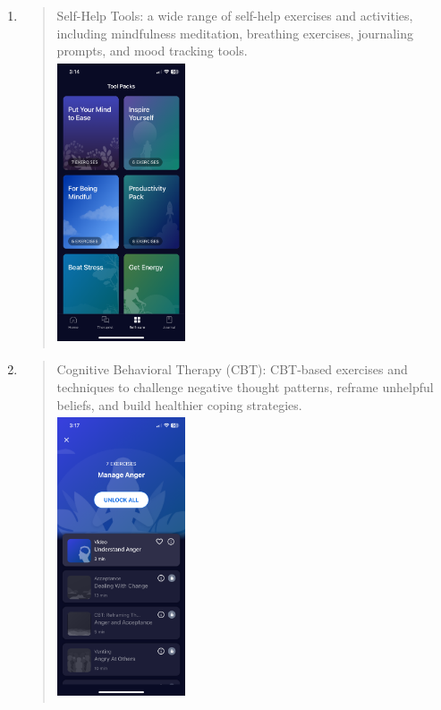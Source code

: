 \documentclass[manuscript,screen,review]{acmart}
\begin{document}
\begin{enumerate}
\begin{quote}
  \end{quote}
\item
  \begin{quote}
  Self-Help Tools: a wide range of self-help exercises and activities,
  including mindfulness meditation, breathing exercises, journaling
  prompts, and mood tracking tools.\\
  \includegraphics[width=1.49474in,height=3.31321in]{vertopal.com_Untitleddocument/vertopal_25c0ff455f73469eb1b6e3e4452807f6/media/image4.png}
  \end{quote}
\item
  \begin{quote}
  Cognitive Behavioral Therapy (CBT): CBT-based exercises and techniques
  to challenge negative thought patterns, reframe unhelpful beliefs, and
  build healthier coping strategies.\\
  \includegraphics[width=1.49474in,height=3.31321in]{vertopal.com_Untitleddocument/vertopal_25c0ff455f73469eb1b6e3e4452807f6/media/image6.png}
  \end{quote}
\end{enumerate}
\end{document}
